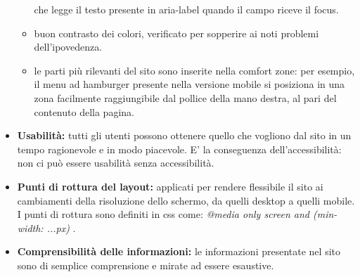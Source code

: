 \begin{itemize}
\begin{itemize}
		che legge il testo presente in aria-label quando il campo riceve il focus. 
		\item buon contrasto dei colori, verificato per sopperire ai noti problemi dell'ipovedenza.\\
		\item le parti più rilevanti del sito sono inserite nella comfort zone: per esempio, il menu ad hamburger presente nella versione mobile si posiziona in una zona 
		facilmente raggiungibile dal pollice della mano destra, al pari del contenuto della pagina.\\
	\end{itemize}
	\item \textbf{Usabilità:} tutti gli utenti possono ottenere quello che vogliono dal sito in un tempo ragionevole e in modo piacevole. E' la conseguenza dell'accessibilità: 
	non ci può essere usabilità senza accessibilità.\\ 
	\item \textbf{Punti di rottura del layout:} applicati per rendere flessibile il sito ai cambiamenti della risoluzione dello schermo, da quelli desktop a quelli mobile.\\
	I punti di rottura sono definiti in css come: \emph{@media only screen and (min-width: ...px) }.
	\item \textbf{Comprensibilità delle informazioni:} le informazioni presentate nel sito sono di semplice comprensione e mirate ad essere esaustive.\\
\end{itemize}